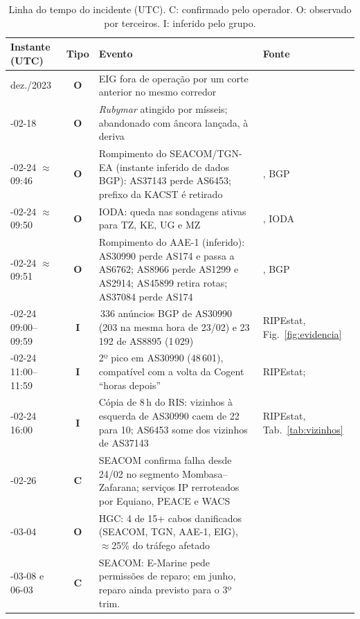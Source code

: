 \documentclass[12pt]{article}
\newcommand{\evC}{\textbf{C}}   %
\newcommand{\evO}{\textbf{O}}   %
\newcommand{\evI}{\textbf{I}}   %
\begin{document}
\begin{table}[htb]
\centering
\caption{Linha do tempo do incidente (UTC). C: confirmado pelo operador. O: observado por terceiros. I: inferido pelo grupo.}
\label{tab:timeline}
\footnotesize
\begin{tabularx}{\textwidth}{@{} >{\raggedright\arraybackslash}p{2.35cm} c >{\raggedright\arraybackslash}X >{\raggedright\arraybackslash}p{2.9cm} @{}}
\toprule
\textbf{Instante (UTC)} & \textbf{Tipo} & \textbf{Evento} & \textbf{Fonte} \\
\midrule
dez./2023 & \evO & EIG fora de operação por um corte anterior no mesmo corredor & \cite{madory2024} \\
2024-02-18 & \evO & \textit{Rubymar} atingido por mísseis; abandonado com âncora lançada, à deriva & \cite{madory2024} \\
2024-02-24 $\approx$09:46 & \evO & Rompimento do SEACOM/TGN-EA (instante inferido de dados BGP): AS37143 perde AS6453; prefixo da KACST é retirado & \cite{madory2024}, BGP \\
2024-02-24 $\approx$09:50 & \evO & IODA: queda nas sondagens ativas para TZ, KE, UG e MZ & \cite{madory2024}, IODA \\
2024-02-24 $\approx$09:51 & \evO & Rompimento do AAE-1 (inferido): AS30990 perde AS174 e passa a AS6762; AS8966 perde AS1299 e AS2914; AS45899 retira rotas; AS37084 perde AS174 & \cite{madory2024}, BGP \\
2024-02-24 09:00--09:59 & \evI & 73\,336 anúncios BGP de AS30990 (203 na mesma hora de 23/02) e 23\,192 de AS8895 (1\,029) & RIPEstat, Fig.~\ref{fig:evidencia} \\
2024-02-24 11:00--11:59 & \evI & 2º pico em AS30990 (48\,601), compatível com a volta da Cogent ``horas depois'' & RIPEstat; \cite{madory2024} \\
2024-02-24 16:00 & \evI & Cópia de 8\,h do RIS: vizinhos à esquerda de AS30990 caem de 22 para 10; AS6453 some dos vizinhos de AS37143 & RIPEstat, Tab.~\ref{tab:vizinhos} \\
2024-02-26 & \evC & SEACOM confirma falha desde 24/02 no segmento Mombasa--Zafarana; serviços IP rerroteados por Equiano, PEACE e WACS & \cite{seacom2024a} \\
2024-03-04 & \evO & HGC: 4 de 15+ cabos danificados (SEACOM, TGN, AAE-1, EIG), $\approx$25\% do tráfego afetado & \cite{hgc2024b} \\
2024-03-08 e 06-03 & \evC & SEACOM: E-Marine pede permissões de reparo; em junho, reparo ainda previsto para o 3º trim. & \cite{seacom2024c,seacom2024b} \\
\bottomrule
\end{tabularx}
\end{table}
\end{document}

